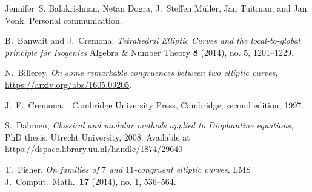 \documentclass[12pt, reqno]{amsart}
\newcommand{\calL}{\mathcal{L}}
\newcommand{\calM}{\mathcal{M}}
\numberwithin{equation}{section}
\theoremstyle{definition}
\theoremstyle{remark}
\begin{document}



 
\begin{thebibliography}{999}


Jennifer~S. Balakrishnan, Netan Dogra, J.~Steffen M\"uller, Jan Tuitman, and
  Jan Vonk.
\newblock Personal communication.

 B.\ Banwait and J.\ Cremona, 
{\em Tetrahedral Elliptic Curves and the local-to-global principle for Isogenies}
Algebra \& Number Theory {\bf 8} (2014), no. 5, 1201--1229.

 N.~Billerey,
  {\em On some remarkable congruences between two elliptic curves},
  \url{https://arxiv.org/abs/1605.09205}.


J.~E.~Cremona.
.
\newblock Cambridge University Press, Cambridge, second edition, 1997.

 S.\ Dahmen,
 {\em Classical and modular methods applied to Diophantine equations}, 
 PhD thesis, Utrecht University, 2008. Available at \\
 \url{https://dspace.library.uu.nl/handle/1874/29640}

 T.\ Fisher,
{\em On families of $7$ and $11$-congruent elliptic curves}, 
LMS J.\ Comput.\ Math.\ {\bf 17} (2014), no. 1, 536--564.


\end{thebibliography}
\end{document}
